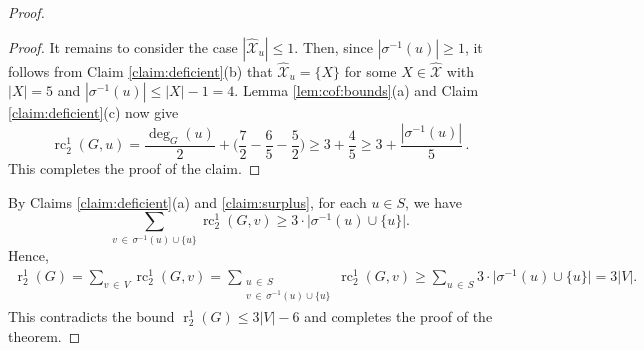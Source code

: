 \documentclass[11pt,a4paper]{article}
\theoremstyle{definition}
\DeclareMathOperator{\rr}{r}
\DeclareMathOperator{\rc}{rc}
\newcommand{\hXX}{\hat{\mathcal{X}}}
\begin{document}
\begin{proof}
\begin{proof}
It remains to consider the case $|\hXX_u|\leq 1$. Then, since $|\sigma^{-1}(u)|\geq 1$, it follows from Claim \ref{claim:deficient}(b) that $\hXX_u= \{X\}$ for some $X\in \hXX$ with $|X|=5$ and 
$|\sigma^{-1}(u)|\leq |X|-1= 4$.
Lemma \ref{lem:cof:bounds}(a) and Claim \ref{claim:deficient}(c) now give
$$\rc_2^1(G,u)= \frac{\deg_G(u)}{2} + \Big(\frac{7}{2}-\frac{6}{5}-\frac{5}{2}\Big) \geq 3+\frac{4}{5} \geq 3+\frac{|\sigma^{-1}(u)|}{5}\,.$$
This completes the proof of the claim.
\end{proof}

By Claims \ref{claim:deficient}(a) and \ref{claim:surplus}, for each $u\in S$, we have
$$\sum_{v \, \in \, \sigma^{-1}(u)\cup \{u\}} \rc_2^1(G,v)\geq 3\cdot \big|\sigma^{-1}(u)\cup \{u\}\big|.$$
Hence,
\begin{gather*}
\rr_2^1(G)=\sum_{v\,\in\, V}\rc_2^1(G,v)=\sum_{\substack{u\, \in\, S\\v\,\in\, \sigma^{-1}(u)\cup \{u\}}}\rc_2^1(G,v)
\geq \sum_{u\,\in\, S}3\cdot\big|\sigma^{-1}(u)\cup\{u\}\big|=3|V|.
\end{gather*}
This contradicts the bound $\rr_2^1(G)\leq 3|V|-6$ and completes the proof of the theorem.   
\end{proof}
\end{document}

